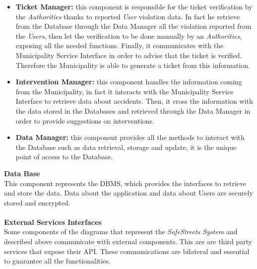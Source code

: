 \documentclass{article}
\begin{document}
\begin{itemize}
		\item {\bf Ticket Manager:} this component is responsible for the ticket verification by the {\it Authorities} thanks to reported {\it User} violation data. In fact he retrieve from the Database through the Data Manager all the violation reported from the {\it Users}, then let the verification to be done manually by an {\it Authorities}, exposing all the needed functions. Finally, it communicates with the Municipality Service Interface in order to advise that the ticket is verified. Therefore the Municipality is able to generate a ticket from this information.
		\item {\bf Intervention Manager:} this component handles the information coming from the Municipality, in fact it interacts with the Municipality Service Interface to retrieve data about accidents. Then, it cross the information with the data stored in the Databases and retrieved through the Data Manager in order to provide suggestions on interventions. 
		\item {\bf Data Manager:} this component provides all the methods to interact with the Database such as data retrieval, storage and update, it is the unique point of access to the Database. 
		\end{itemize}
		{\bf Data Base} \\
		This component represents the DBMS, which provides the interfaces to retrieve and store the data. Data about the application and data about Users are securely stored and encrypted.
		\\ \\
		{\bf External Services Interfaces} \\
		Some components of the diagrams that represent the {\it SafeStreets System} and described above communicate with external components. This are are third party services that expose their API. These communications are bilateral and essential to guarantee all the functionalities. 
\end{document}
